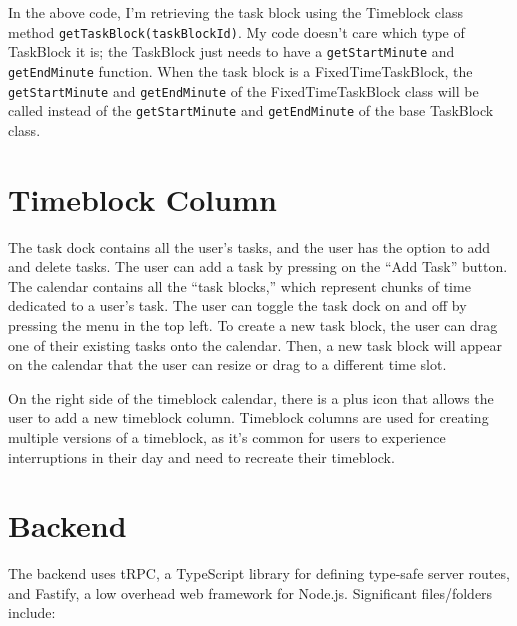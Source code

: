\documentclass[notitlepage, 12pt]{report}
\newcommand{\code}[1]{\texttt{#1}}
\begin{document}
\begin{sloppypar}
	In the above code, I'm retrieving the task block using the Timeblock class method \code{getTaskBlock(taskBlockId)}. My code doesn't care which type of TaskBlock it is; the TaskBlock just needs to have a \code{getStartMinute} and \code{getEndMinute} function. When the task block is a FixedTimeTaskBlock, the \code{getStartMinute} and \code{getEndMinute} of the FixedTimeTaskBlock class will be called instead of the \code{getStartMinute} and \code{getEndMinute} of the base TaskBlock class.
\end{sloppypar}

\section*{Timeblock Column}

The task dock contains all the user's tasks, and the user has the option to add and delete tasks. The user can add a task by pressing on the ``Add Task'' button. The calendar contains all the ``task blocks,'' which represent chunks of time dedicated to a user's task. The user can toggle the task dock on and off by pressing the menu in the top left. To create a new task block, the user can drag one of their existing tasks onto the calendar. Then, a new task block will appear on the calendar that the user can resize or drag to a different time slot.

On the right side of the timeblock calendar, there is a plus icon that allows the user to add a new timeblock column. Timeblock columns are used for creating multiple versions of a timeblock, as it's common for users to experience interruptions in their day and need to recreate their timeblock.

\section*{Backend}
The backend uses tRPC, a TypeScript library for defining type-safe server routes, and Fastify, a low overhead web framework for Node.js. Significant files/folders include:
\end{document}

